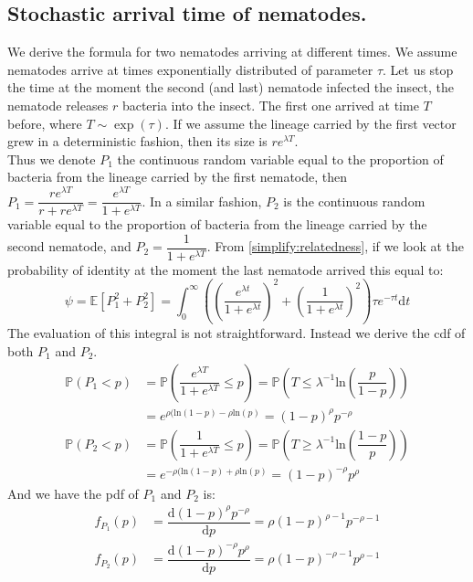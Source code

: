 \documentclass{article}
\newcommand{\ud}{{\mathrm{d}}}
\newcommand{\pr}{{\mathbb{P}}}
\begin{document}
 \subsection{Stochastic arrival time of nematodes.}
  We derive the formula for two nematodes arriving at different times. We assume nematodes arrive at times exponentially distributed of parameter $ \tau$. Let us stop the time at the moment the second (and last) nematode infected the insect, the nematode releases $r$ bacteria into the insect. The first one arrived at time $T$ before, where $T\sim \exp ( \tau)$. If we assume the lineage carried by the first vector grew in a deterministic fashion, then its size is $r e^{\lambda  T}$. \\
  Thus we denote $P_1$ the continuous random variable equal to the proportion of bacteria from the lineage carried by the first nematode, then $P_1=\dfrac{r e^{\lambda T}}{r+re^{\lambda T}}=\dfrac{ e^{\lambda T}}{1+e^{\lambda T}}$. In a similar fashion, $P_2$ is the continuous random variable equal to the proportion of bacteria from the lineage carried by the second nematode, and $P_2=\dfrac{1}{1+e^{\lambda T}}$.
  From \eqref{simplify:relatedness}, if we look at the probability of identity at the moment the last nematode arrived this equal to:
  \begin{equation}
  \psi=\mathbb{E}[P_1^2+P_2^2]=\int_0^\infty \left( \left( \dfrac{ e^{\lambda t}}{1+e^{\lambda t}} \right)^2 + \left( \dfrac{1}{1+e^{\lambda t}} \right)^2 \right) \tau e^{ -\tau t } \ud t
  \end{equation}
  The evaluation of this integral is not straightforward. Instead we derive the cdf of both $P_1$ and $P_2$.
  \begin{align}
  \pr ( P_1 < p) &= \pr \left(\dfrac{e^{\lambda T}}{1+e^{\lambda T}} \leq p\right)= \pr \left(T \leq \lambda^{-1} \mathrm{ln}\left( \dfrac{p}{1-p} \right) \right) \\
  &=  e^{\rho(\mathrm{ln}(1-p)-\rho \mathrm{ln}(p)  } = (1-p)^{\rho} p^{-\rho} 
  \end{align}  
  \begin{align}
  \pr ( P_2 < p) &= \pr \left(\dfrac{1}{1+e^{\lambda T}} \leq p\right)= \pr \left(T \geq \lambda^{-1} \mathrm{ln}\left( \dfrac{1-p}{p} \right) \right) \\
  &=  e^{-\rho(\mathrm{ln}(1-p)+\rho \mathrm{ln}(p)  } = (1-p)^{-\rho} p^\rho
  \end{align}
  And we have the pdf of $P_1$ and $P_2$ is:
  \begin{align}
  f_{P_1}(p) &= \dfrac{ \ud (1-p)^{\rho} p^{-\rho} }{ \ud p} =  \rho (1-p)^{\rho-1} p^{-\rho-1}\\
  f_{P_2}(p) &= \dfrac{ \ud (1-p)^{-\rho} p^\rho }{ \ud p} =  \rho (1-p)^{-\rho-1} p^{\rho-1}
  \end{align}
\end{document}
